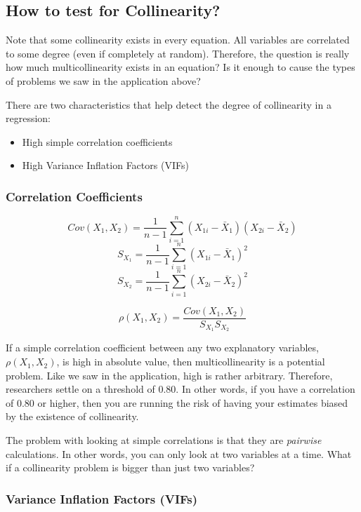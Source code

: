 \documentclass[
]{book}
\begin{document}
\hypertarget{how-to-test-for-collinearity}{%
\subsection{How to test for Collinearity?}\label{how-to-test-for-collinearity}}

Note that some collinearity exists in every equation. All variables are correlated to some degree (even if completely at random). Therefore, the question is really how much multicollinearity exists in an equation? Is it enough to cause the types of problems we saw in the application above?

There are two characteristics that help detect the degree of collinearity in a regression:

\begin{itemize}
\item
  High simple correlation coefficients
\item
  High Variance Inflation Factors (VIFs)
\end{itemize}

\hypertarget{correlation-coefficients}{%
\subsubsection*{Correlation Coefficients}\label{correlation-coefficients}}

\[Cov(X_1,X_2)=\frac{1}{n-1} \sum_{i=1}^n (X_{1i}-\bar{X}_1)(X_{2i}-\bar{X}_2)\]
\[S_{X_1} = \frac{1}{n-1} \sum_{i=1}^n (X_{1i}-\bar{X}_1)^2\]
\[S_{X_2} = \frac{1}{n-1} \sum_{i=1}^n (X_{2i}-\bar{X}_2)^2\]

\[\rho(X_1,X_2) = \frac{Cov(X_1,X_2)}{S_{X_1}S_{X_2}}\]

If a simple correlation coefficient between any two explanatory variables, \(\rho(X_1,X_2)\), is high in absolute value, then multicollinearity is a potential problem. Like we saw in the application, high is rather arbitrary. Therefore, researchers settle on a threshold of 0.80. In other words, if you have a correlation of 0.80 or higher, then you are running the risk of having your estimates biased by the existence of collinearity.

The problem with looking at simple correlations is that they are \emph{pairwise} calculations. In other words, you can only look at two variables at a time. What if a collinearity problem is bigger than just two variables?

\hypertarget{variance-inflation-factors-vifs}{%
\subsubsection*{Variance Inflation Factors (VIFs)}\label{variance-inflation-factors-vifs}}
\end{document}
